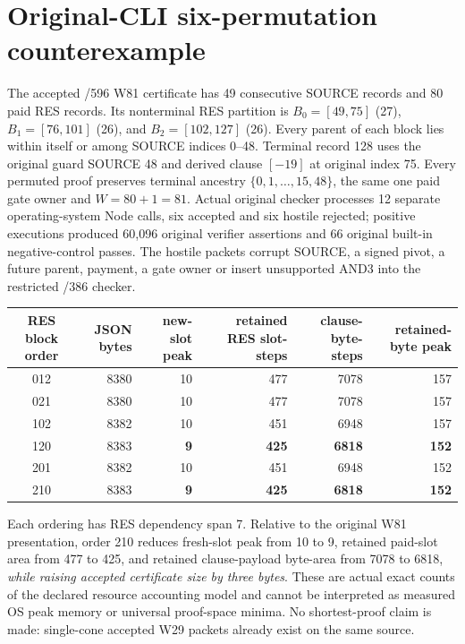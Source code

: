 \documentclass[11pt]{article}
\begin{document}
\section*{Original-CLI six-permutation counterexample}
The accepted /596 W81 certificate has 49 consecutive SOURCE records and 80 paid RES records. Its nonterminal RES partition is $B_0=[49,75]$ (27), $B_1=[76,101]$ (26), and $B_2=[102,127]$ (26). Every parent of each block lies within itself or among SOURCE indices 0--48. Terminal record 128 uses the original guard SOURCE 48 and derived clause $[-19]$ at original index 75. Every permuted proof preserves terminal ancestry $\{0,1,\ldots,15,48\}$, the same one paid gate owner and $W=80+1=81$. Actual original checker processes 12 separate operating-system Node calls, six accepted and six hostile rejected; positive executions produced 60,096 original verifier assertions and 66 original built-in negative-control passes. The hostile packets corrupt SOURCE, a signed pivot, a future parent, payment, a gate owner or insert unsupported AND3 into the restricted /386 checker.
\begin{center}\begin{tabular}{crrrrr}
\toprule
RES block order & JSON bytes & new-slot peak & retained RES slot-steps & clause-byte-steps & retained-byte peak\\
\midrule
012 & 8380 & 10 & 477 & 7078 & 157\\
021 & 8380 & 10 & 477 & 7078 & 157\\
102 & 8382 & 10 & 451 & 6948 & 157\\
120 & 8383 & \textbf{9} & \textbf{425} & \textbf{6818} & \textbf{152}\\
201 & 8382 & 10 & 451 & 6948 & 152\\
210 & 8383 & \textbf{9} & \textbf{425} & \textbf{6818} & \textbf{152}\\
\bottomrule
\end{tabular}\end{center}
Each ordering has RES dependency span 7. Relative to the original W81 presentation, order 210 reduces fresh-slot peak from 10 to 9, retained paid-slot area from 477 to 425, and retained clause-payload byte-area from 7078 to 6818, \emph{while raising accepted certificate size by three bytes}. These are actual exact counts of the declared resource accounting model and cannot be interpreted as measured OS peak memory or universal proof-space minima. No shortest-proof claim is made: single-cone accepted W29 packets already exist on the same source.
\end{document}
